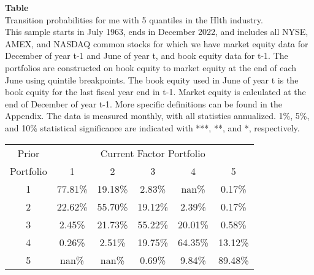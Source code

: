 \begin{table*}[ht!]
\raggedright
{}
\label{tab: transition_probs_me_Hlth_with_5_quantiles}
\textbf{Table \thetable} \\
Transition probabilities for me with 5 quantiles in the Hlth industry. \\
\hspace*{1em}This sample starts in July 1963, ends in December 2022, and includes all NYSE, AMEX, and NASDAQ common stocks for which we have market equity data for December of year t-1 and June of year t, and book equity data for t-1. The portfolios are constructed on book equity to market equity at the end of each June using quintile breakpoints.  The book equity used in June of year t is the book equity for the last fiscal year end in t-1.  Market equity is calculated at the end of December of year t-1.  More specific definitions can be found in the Appendix.  The data is measured monthly, with all statistics annualized.  1\%, 5\%, and 10\% statistical significance are indicated with ***, **, and *, respectively. \\
\vspace{0.5em}
\centering
\begin{adjustbox}{max width=\textwidth}
\begin{tabular}{@{}cccccc@{}}
\toprule
Prior & \multicolumn{5}{c}{Current Factor Portfolio} \\
Portfolio & 1 & 2 & 3 & 4 & 5 \\
\midrule
1 & 77.81\% & 19.18\% & 2.83\% & nan\% & 0.17\% \\
2 & 22.62\% & 55.70\% & 19.12\% & 2.39\% & 0.17\% \\
3 & 2.45\% & 21.73\% & 55.22\% & 20.01\% & 0.58\% \\
4 & 0.26\% & 2.51\% & 19.75\% & 64.35\% & 13.12\% \\
5 & nan\% & nan\% & 0.69\% & 9.84\% & 89.48\% \\
\bottomrule
\end{tabular}
\end{adjustbox}
\end{table*}